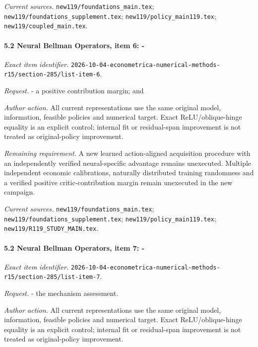 \par\emph{Current sources.} \nolinkurl{new119/foundations_main.tex}; \nolinkurl{new119/foundations_supplement.tex}; \nolinkurl{new119/policy_main119.tex}; \nolinkurl{new119/coupled_main.tex}.

\paragraph{5.2 Neural Bellman Operators, item 6: -}

\emph{Exact item identifier.} \nolinkurl{2026-10-04-econometrica-numerical-methods-r15/section-285/list-item-6}.

\par\emph{Request.} - a positive contribution margin; and

\par\emph{Author action.} All current representations use the same original model, information, feasible policies and numerical target. Exact ReLU/\allowbreak{}oblique-hinge equality is an explicit control; internal fit or residual-span improvement is not treated as original-policy improvement.

\par\emph{Remaining requirement.} A new learned action-aligned acquisition procedure with an independently verified neural-specific advantage remains unexecuted. Multiple independent economic calibrations, naturally distributed training randomness and a verified positive critic-contribution margin remain unexecuted in the new campaign.

\par\emph{Current sources.} \nolinkurl{new119/foundations_main.tex}; \nolinkurl{new119/foundations_supplement.tex}; \nolinkurl{new119/policy_main119.tex}; \nolinkurl{new119/R119_STUDY_MAIN.tex}.

\paragraph{5.2 Neural Bellman Operators, item 7: -}

\emph{Exact item identifier.} \nolinkurl{2026-10-04-econometrica-numerical-methods-r15/section-285/list-item-7}.

\par\emph{Request.} - the mechanism assessment.

\par\emph{Author action.} All current representations use the same original model, information, feasible policies and numerical target. Exact ReLU/\allowbreak{}oblique-hinge equality is an explicit control; internal fit or residual-span improvement is not treated as original-policy improvement.

